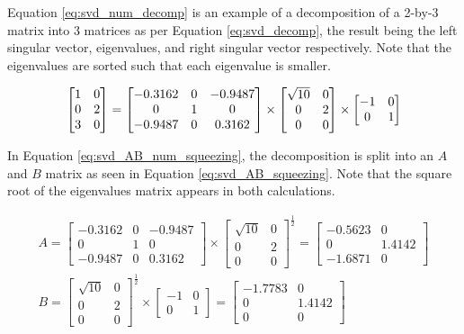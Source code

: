 Equation \ref{eq:svd_num_decomp} is an example of a decomposition of a 2-by-3 matrix into 3 matrices as per Equation \ref{eq:svd_decomp}, the result being the left singular vector, eigenvalues, and right singular vector respectively. Note that the eigenvalues are sorted such that each eigenvalue is smaller.

\begin{equation}\label{eq:svd_num_decomp}
\centering
\begin{bmatrix}
1 & 0\\ 
0 & 2\\ 
3 & 0
\end{bmatrix} = 
\begin{bmatrix}
-0.3162 & 0 & -0.9487\\ 
0 & 1 & 0\\ 
-0.9487 & 0 & 0.3162
\end{bmatrix} \times 
\begin{bmatrix}
\sqrt{10} & 0\\ 
0 & 2\\ 
0 & 0
\end{bmatrix} \times
\begin{bmatrix}
-1 & 0\\ 
0 & 1
\end{bmatrix}
\end{equation}

In Equation \ref{eq:svd_AB_num_squeezing}, the decomposition is split into an $A$ and $B$ matrix as seen in Equation \ref{eq:svd_AB_squeezing}. Note that the square root of the eigenvalues matrix appears in both calculations.

\begin{equation}\label{eq:svd_AB_num_squeezing}
\begin{split}
A = \begin{bmatrix}
-0.3162 & 0 & -0.9487\\ 
0 & 1 & 0\\ 
-0.9487 & 0 & 0.3162
\end{bmatrix} \times
\begin{bmatrix}
\sqrt{10} & 0\\ 
0 & 2\\ 
0 & 0
\end{bmatrix}^{\frac{1}{2}} =
\begin{bmatrix}
-0.5623 & 0\\ 
0 & 1.4142\\ 
-1.6871 & 0
\end{bmatrix}
\\
B = \begin{bmatrix}
\sqrt{10} & 0\\ 
0 & 2\\ 
0 & 0
\end{bmatrix}^{\frac{1}{2}} \times
\begin{bmatrix}
-1 & 0\\ 
0 & 1
\end{bmatrix} =
\begin{bmatrix}
-1.7783 & 0\\ 
0 & 1.4142\\
0 & 0
\end{bmatrix}
\end{split}
\end{equation}

